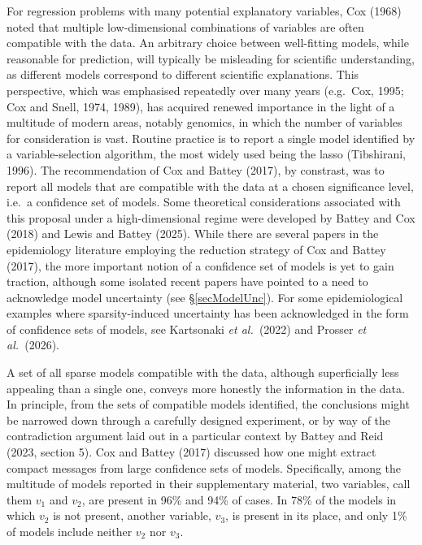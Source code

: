 \documentclass[10pt, reqno]{amsart}
\numberwithin{equation}{section}
\begin{document}
For regression problems with many potential explanatory variables, Cox (1968) noted that multiple low-dimensional combinations of variables are often compatible with the data. An arbitrary choice between well-fitting models, while reasonable for prediction, will typically be misleading for scientific understanding, as different models correspond to different scientific explanations. 
This perspective, which was emphasised repeatedly over many years (e.g.~Cox, 1995; Cox and Snell, 1974, 1989), has acquired renewed importance in the light of a multitude of modern areas, notably genomics, in which the number of variables for consideration is vast. Routine practice is to report a single model identified by a variable-selection algorithm, the most widely used being the lasso (Tibshirani, 1996). The recommendation of Cox and Battey (2017), by constrast, was to report all models that are compatible with the data at a chosen significance level, i.e.~a confidence set of models. Some theoretical considerations associated with this proposal under a high-dimensional regime were developed by Battey and Cox (2018) and Lewis and Battey (2025). While there are several papers in the epidemiology literature employing the reduction strategy of Cox and Battey (2017), the more important notion of a confidence set of models is yet to gain traction, although some isolated recent papers have pointed to a need to acknowledge model uncertainty (see \S \ref{secModelUnc}). For some epidemiological examples where sparsity-induced uncertainty has been acknowledged in the form of confidence sets of models, see Kartsonaki \emph{et al.~}(2022) and Prosser \emph{et al.~}(2026). 


A set of all sparse models compatible with the data, although superficially less appealing than a single one, conveys more honestly the information in the data. In principle, from the sets of compatible models identified, the conclusions might be narrowed down through a carefully designed experiment, or by way of the contradiction argument laid out in a particular context by Battey and Reid (2023, section 5). Cox and Battey (2017) discussed how one might extract compact messages from large confidence sets of models. Specifically, among the multitude of models reported in their supplementary material, two variables, call them $v_1$ and $v_2$, are present in 96\% and 94\% of cases. In 78\% of the models in which $v_2$ is not present, another variable, $v_3$, is present in its place, and only 1\% of models include neither $v_2$ nor $v_3$.
\end{document}
